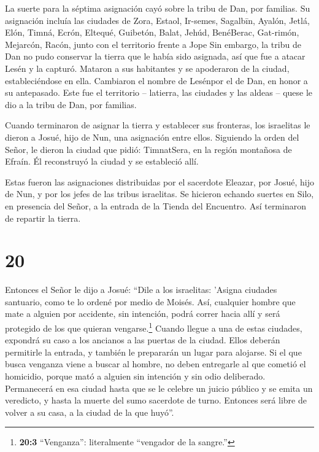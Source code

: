  La suerte para la séptima asignación cayó sobre la tribu
de Dan, por familias.  Su asignación incluía las ciudades
de Zora, Estaol, Ir-semes,  Sagalbīn, Ayalón, Jetlá,
 Elón, Timná, Ecrón,  Eltequé, Guibetón,
Balat,  Jehúd, BenéBerac, Gat-rimón, 
Mejarcón, Racón, junto con el territorio frente a Jope  Sin
embargo, la tribu de Dan no pudo conservar la tierra que le había sido
asignada, así que fue a atacar Lesén y la capturó. Mataron a sus
habitantes y se apoderaron de la ciudad, estableciéndose en ella.
Cambiaron el nombre de Lesénpor el de Dan, en honor a su antepasado.
 Este fue el territorio -- latierra, las ciudades y las
aldeas -- quese le dio a la tribu de Dan, por familias.

 Cuando terminaron de asignar la tierra y establecer sus
fronteras, los israelitas le dieron a Josué, hijo de Nun, una asignación
entre ellos.  Siguiendo la orden del Señor, le dieron la
ciudad que pidió: TimnatSera, en la región montañosa de Efraín. Él
reconstruyó la ciudad y se estableció allí.

 Estas fueron las asignaciones distribuidas por el
sacerdote Eleazar, por Josué, hijo de Nun, y por los jefes de las tribus
israelitas. Se hicieron echando suertes en Silo, en presencia del Señor,
a la entrada de la Tienda del Encuentro. Así terminaron de repartir la
tierra.

\hypertarget{section-19}{%
\section{20}\label{section-19}}

 Entonces el Señor le dijo a Josué:  ``Dile a
los israelitas: 'Asigna ciudades santuario, como te lo ordené por medio
de Moisés.  Así, cualquier hombre que mate a alguien por
accidente, sin intención, podrá correr hacia allí y será protegido de
los que quieran vengarse.\footnote{\textbf{20:3} ``Venganza'':
  literalmente ``vengador de la sangre.''}  Cuando llegue a
una de estas ciudades, expondrá su caso a los ancianos a las puertas de
la ciudad. Ellos deberán permitirle la entrada, y también le prepararán
un lugar para alojarse.  Si el que busca venganza viene a
buscar al hombre, no deben entregarle al que cometió el homicidio,
porque mató a alguien sin intención y sin odio deliberado. 
Permanecerá en esa ciudad hasta que se le celebre un juicio público y se
emita un veredicto, y hasta la muerte del sumo sacerdote de turno.
Entonces será libre de volver a su casa, a la ciudad de la que huyó''.

